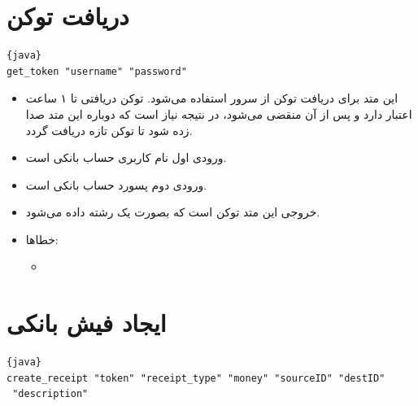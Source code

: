 \documentclass[]{article}
\begin{document}
\section*{{\titr دریافت توکن}}


\begin{latin}

\begin{lstlisting}{java}
get_token "username" "password"
\end{lstlisting}

\end{latin}

\begin{itemize}
\item
این متد برای دریافت توکن از سرور استفاده می‌شود. توکن دریافتی تا ۱ ساعت اعتبار دارد و پس از آن منقضی می‌شود، در نتیجه نیاز است که دوباره این متد صدا زده شود تا توکن تازه دریافت گردد.
\item
\textcolor{CustomColor}{ورودی} اول نام کاربری حساب بانکی است.

\item
\textcolor{CustomColor}{ورودی} دوم پسورد حساب بانکی است.

\item
\textcolor{CustomColor}{خروجی} این متد توکن است که بصورت یک رشته داده می‌شود.

\item
\textcolor{CustomColor}{خطاها}:

\begin{itemize}

\item
{}

\end{itemize}


\end{itemize}

\section*{{\titr ایجاد فیش بانکی}}

\begin{latin}

\begin{lstlisting}{java}
create_receipt "token" "receipt_type" "money" "sourceID" "destID"
 "description"

\end{lstlisting}

\end{latin}
\end{document}
